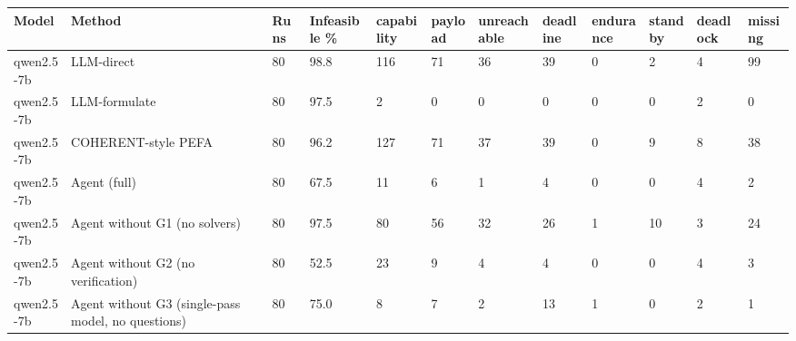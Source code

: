 \begin{tabular}{llllllllllll}
\toprule
Model & Method & Runs & Infeasible \% & capability & payload & unreachable & deadline & endurance & standby & deadlock & missing \\
\midrule
qwen2.5-7b & LLM-direct & 80 & 98.8 & 116 & 71 & 36 & 39 & 0 & 2 & 4 & 99 \\
qwen2.5-7b & LLM-formulate & 80 & 97.5 & 2 & 0 & 0 & 0 & 0 & 0 & 2 & 0 \\
qwen2.5-7b & COHERENT-style PEFA & 80 & 96.2 & 127 & 71 & 37 & 39 & 0 & 9 & 8 & 38 \\
qwen2.5-7b & Agent (full) & 80 & 67.5 & 11 & 6 & 1 & 4 & 0 & 0 & 4 & 2 \\
qwen2.5-7b & Agent without G1 (no solvers) & 80 & 97.5 & 80 & 56 & 32 & 26 & 1 & 10 & 3 & 24 \\
qwen2.5-7b & Agent without G2 (no verification) & 80 & 52.5 & 23 & 9 & 4 & 4 & 0 & 0 & 4 & 3 \\
qwen2.5-7b & Agent without G3 (single-pass model, no questions) & 80 & 75.0 & 8 & 7 & 2 & 13 & 1 & 0 & 2 & 1 \\
\bottomrule
\end{tabular}
